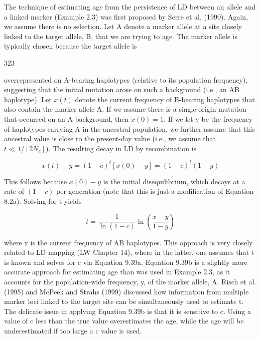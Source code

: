 \documentclass{article}
\begin{document}
The technique of estimating age from the persistence of LD between an allele and a linked marker (Example 2.3) was first proposed by Serre et al. (1990). Again, we assume there is no selection. Let A denote a marker allele at a site closely linked to the target allele, B, that we are trying to age. The marker allele is typically chosen because the target allele is

323

overrepresented on A-bearing haplotypes (relative to its population frequency), suggesting that the initial mutation arose on such a background (i.e., an AB haplotype). Let  $ x(t) $ denote the current frequency of B-bearing haplotypes that also contain the marker allele A. If we assume there is a single-origin mutation that occurred on an A background, then  $ x(0) = 1 $. If we let y be the frequency of haplotypes carrying A in the ancestral population, we further assume that this ancestral value is close to the present-day value (i.e., we assume that  $ t \ll 1/[2N_e] $). The resulting decay in LD by recombination is

\begin{equation}
x(t)-y=(1-c)^{t}[x(0)-y]=(1-c)^{t}(1-y)
\tag{9.39a}
\label{eq:9_39a}
\end{equation}

This follows because  $ x(0) - y $ is the initial disequilibrium, which decays at a rate of  $ (1 - c) $ per generation (note that this is just a modification of Equation 8.2a). Solving for t yields

\begin{equation}
t=\frac{1}{\ln(1-c)}\ln\left(\frac{x-y}{1-y}\right)
\tag{9.39b}
\label{eq:9_39b}
\end{equation}

where x is the current frequency of AB haplotypes. This approach is very closely related to LD mapping (LW Chapter 14), where in the latter, one assumes that t is known and solves for c via Equation 9.39a. Equation 9.39b is a slightly more accurate approach for estimating age than was used in Example 2.3, as it accounts for the population-wide frequency, y, of the marker allele, A. Risch et al. (1995) and McPeek and Strahs (1999) discussed how information from multiple marker loci linked to the target site can be simultaneously used to estimate t. The delicate issue in applying Equation 9.39b is that it is sensitive to c. Using a value of c less than the true value overestimates the age, while the age will be underestimated if too large a c value is used.
\end{document}
